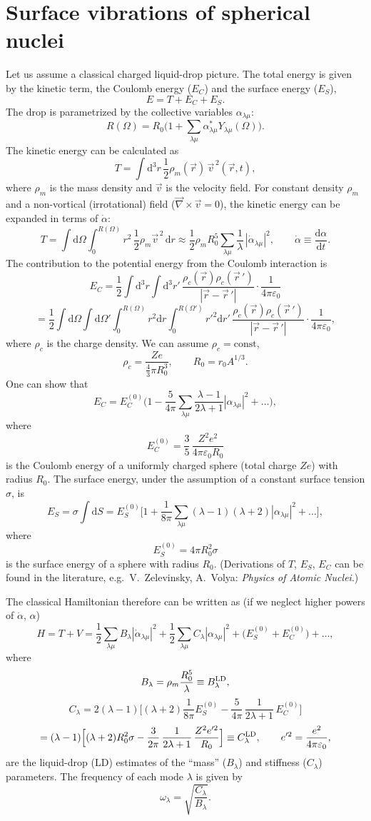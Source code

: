 \documentclass[11pt,a4paper]{article}
\newcommand{\ud}{\mathrm{d}}
\begin{document}
\section{Surface vibrations of spherical nuclei}
Let us assume a classical charged liquid-drop picture. The total energy is given by the kinetic term, the Coulomb energy ($E_C$) and the surface energy ($E_S$),
\[
E=T+E_C+E_S .
\]
The drop is parametrized by the collective variables $\alpha_{\lambda\mu}$:
\[
R(\Omega)=R_0\Big(1+\sum_{\lambda\mu}\alpha^*_{\lambda\mu}Y_{\lambda\mu}(\Omega)\Big).
\]
The kinetic energy can be calculated as
\[
T=\int\ud^3r\,\frac12\rho_m(\vec r)\,\vec v^{\,2}(\vec r,t),
\]
where $\rho_m$ is the mass density and $\vec v$ is the velocity field. For constant density $\rho_m$ and a non-vortical (irrotational) field ($\vec\nabla\times\vec v=0$), the kinetic energy can be expanded in terms of $\dot\alpha$:
\[
T=\int\ud\Omega\int_0^{R(\Omega)}r^2\,\frac12\rho_m\vec v^{\,2}\,\ud r\approx\frac12\rho_mR_0^5\sum_{\lambda\mu}\frac1\lambda\,|\dot\alpha_{\lambda\mu}|^2,
\qquad \dot\alpha\equiv\frac{\ud\alpha}{\ud t}.
\]
The contribution to the potential energy from the Coulomb interaction is
\[
E_C=\frac12\int\ud^3r\int\ud^3r'\,\frac{\rho_c(\vec r)\rho_c(\vec r\,')}{|\vec r-\vec r\,'|}\cdot\frac{1}{4\pi\varepsilon_0}
\]
\[
=\frac12\int\ud\Omega\int\ud\Omega'\int_0^{R(\Omega)}r^2\ud r\int_0^{R(\Omega')}r'^2\ud r'\,\frac{\rho_c(\vec r)\rho_c(\vec r\,')}{|\vec r-\vec r\,'|}\cdot\frac{1}{4\pi\varepsilon_0},
\]
where $\rho_c$ is the charge density. We can assume $\rho_c=\text{const}$,
\[
\rho_c=\frac{Ze}{\frac43\pi R_0^3},\qquad R_0=r_0A^{1/3}.
\]
One can show that
\[
E_C=E_C^{(0)}\Big(1-\frac{5}{4\pi}\sum_{\lambda\mu}\frac{\lambda-1}{2\lambda+1}|\alpha_{\lambda\mu}|^2+\dots\Big),
\]
where
\[
E_C^{(0)}=\frac35\,\frac{Z^2e^2}{4\pi\varepsilon_0R_0}
\]
is the Coulomb energy of a uniformly charged sphere (total charge $Ze$) with radius $R_0$.
The surface energy, under the assumption of a constant surface tension $\sigma$, is
\[
E_S=\sigma\int\ud S=E_S^{(0)}\Big[1+\frac{1}{8\pi}\sum_{\lambda\mu}(\lambda-1)(\lambda+2)|\alpha_{\lambda\mu}|^2+\dots\Big],
\]
where
\[
E_S^{(0)}=4\pi R_0^2\sigma
\]
is the surface energy of a sphere with radius $R_0$. (Derivations of $T$, $E_S$, $E_C$ can be found in the literature, e.g.\ V.~Zelevinsky, A.~Volya: \emph{Physics of Atomic Nuclei}.)

The classical Hamiltonian therefore can be written as (if we neglect higher powers of $\dot\alpha$, $\alpha$)
\[
H=T+V=\frac12\sum_{\lambda\mu}B_\lambda|\dot\alpha_{\lambda\mu}|^2+\frac12\sum_{\lambda\mu}C_\lambda|\alpha_{\lambda\mu}|^2+\big(E_S^{(0)}+E_C^{(0)}\big)+\dots,
\]
where
\[
B_\lambda=\rho_m\frac{R_0^5}{\lambda}\equiv B_\lambda^{\rm LD},
\]
\[
C_\lambda=2(\lambda-1)\Big[(\lambda+2)\frac{1}{8\pi}E_S^{(0)}-\frac{5}{4\pi}\,\frac{1}{2\lambda+1}\,E_C^{(0)}\Big]
\]
\[
=(\lambda-1)\Big[(\lambda+2)R_0^2\sigma-\frac{3}{2\pi}\,\frac{1}{2\lambda+1}\,\frac{Z^2e'^2}{R_0}\Big]\equiv C_\lambda^{\rm LD},
\qquad e'^2=\frac{e^2}{4\pi\varepsilon_0},
\]
are the liquid-drop (LD) estimates of the ``mass'' ($B_\lambda$) and stiffness ($C_\lambda$) parameters.
The frequency of each mode $\lambda$ is given by
\[
\omega_\lambda=\sqrt{\frac{C_\lambda}{B_\lambda}} .
\]
\end{document}
